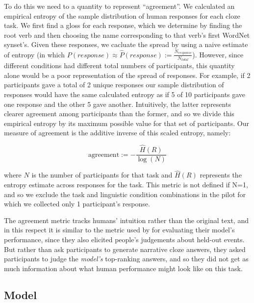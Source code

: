 \documentclass[10pt,a4paper]{article}
\begin{document}
To do this we need to a quantity to represent ``agreement''. We calculated an empirical entropy of the sample distribution of human responses
for each cloze task. We first find a gloss for each response, which we determine by finding the root verb and then choosing the name corresponding to that verb's first WordNet synset's.
Given these responses, we cacluate the spread by using
a naive estimate of entropy 
(in which $P(response) \approx \hat{P}(response) := \frac{N_{response}}{N_{total}}$).
However, since different conditions had different total numbers of participants, this quantity alone would be a poor representation of the spread of responses. For example, if 2 participants gave a total of 2 unique responses our sample distribution of responses would have the same calculated entropy as if 5 of 10 participants gave one response and the other 5 gave another. Intuitively, the latter represents clearer agreement among participants than the former, and so we divide this empirical entropy by its maximum possible value for that set of participants. Our measure of agreement is the additive inverse of this scaled entropy, namely:

$$\mbox{agreement} := - \frac{\hat{H}(R)}{\log(N)}$$

where $N$ is the number of participants for that task and $\hat{H}(R)$ represents the entropy estimate across responses for the task. This metric is not defined if N=1, and so we exclude the task and linguistic condition combinations in the pilot for which we collected only 1 participant's response.

The agreement metric tracks humans' intuition rather than the original text, and in this respect it is similar to the metric used by  for evaluating their model's performance, since they also elicited people's judgements about held-out events. But rather than ask participants to generate narrative cloze answers, they asked participants to judge the {\em model's} top-ranking answers, and so they did not get as much information about what human performance might look like on this task.

\subsection{Model}
\end{document}
